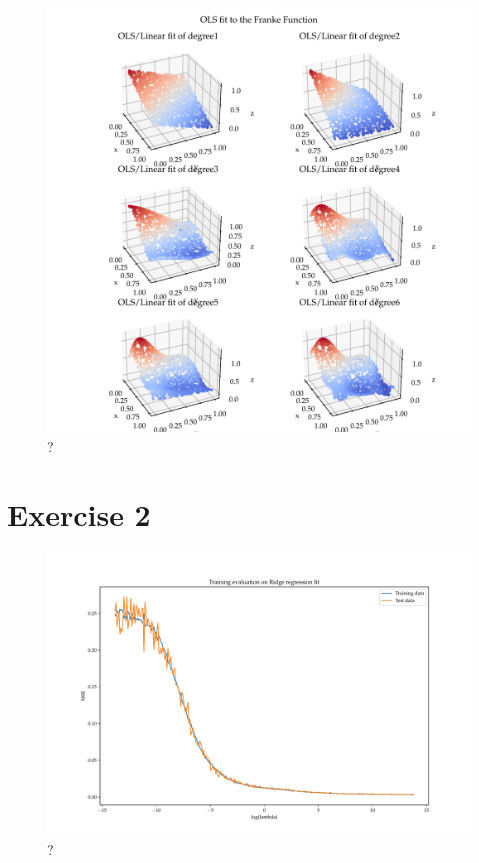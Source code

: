 \documentclass[11pt]{article}
\begin{document}
\begin{figure}
  \centering
  \includegraphics[scale=0.85]{figures/franke_function_fit_OLS.pdf}
  \caption{?}
  \label{fig: ?}
\end{figure}



\section*{Exercise 2}
\begin{figure}
  \centering
  \includegraphics[scale=0.55]{figures/Franke Function Ridge fit evaluation.pdf}
  \caption{?}
  \label{fig: ?}
\end{figure}
\end{document}
